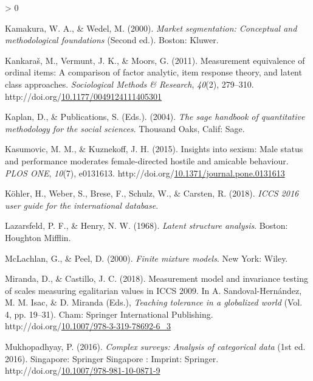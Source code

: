 \documentclass[12pt,a4paper,oneside]{reedthesis}
\newlength{\cslhangindent}
\newenvironment{CSLReferences}[2] %
 {%
  \setlength{\parindent}{0pt}
  \ifodd #1 \everypar{\setlength{\hangindent}{\cslhangindent}}\ignorespaces\fi
  \ifnum #2 > 0
  \setlength{\parskip}{#2\baselineskip}
  \fi
 }%
 {}
\begin{document}
\begin{CSLReferences}{1}{0}
\leavevmode\hypertarget{ref-kamakura_market_2000}{}%
Kamakura, W. A., \& Wedel, M. (2000). \emph{Market segmentation: Conceptual and methodological foundations} (Second ed.). Boston: Kluwer.

\leavevmode\hypertarget{ref-kankaras_measurement_2011}{}%
Kankaraš, M., Vermunt, J. K., \& Moors, G. (2011). Measurement equivalence of ordinal items: A comparison of factor analytic, item response theory, and latent class approaches. \emph{Sociological Methods \& Research}, \emph{40}(2), 279--310. http://doi.org/\href{https://doi.org/10.1177/0049124111405301}{10.1177/0049124111405301}

\leavevmode\hypertarget{ref-kaplan_sage_2004}{}%
Kaplan, D., \& Publications, S. (Eds.). (2004). \emph{The sage handbook of quantitative methodology for the social sciences}. Thousand Oaks, Calif: Sage.

\leavevmode\hypertarget{ref-kasumovic_insights_2015}{}%
Kasumovic, M. M., \& Kuznekoff, J. H. (2015). Insights into sexism: Male status and performance moderates female-directed hostile and amicable behaviour. \emph{{PLOS} {ONE}}, \emph{10}(7), e0131613. http://doi.org/\href{https://doi.org/10.1371/journal.pone.0131613}{10.1371/journal.pone.0131613}

\leavevmode\hypertarget{ref-kohler_iccs_2018}{}%
Köhler, H., Weber, S., Brese, F., Schulz, W., \& Carsten, R. (2018). \emph{{ICCS} 2016 user guide for the international database}.

\leavevmode\hypertarget{ref-lazarsfeld_latent_1968}{}%
Lazarsfeld, P. F., \& Henry, N. W. (1968). \emph{Latent structure analysis}. Boston: Houghton Mifflin.

\leavevmode\hypertarget{ref-mclachlan_finite_2000}{}%
McLachlan, G., \& Peel, D. (2000). \emph{Finite mixture models}. New York: Wiley.

\leavevmode\hypertarget{ref-miranda_measurement_2018}{}%
Miranda, D., \& Castillo, J. C. (2018). Measurement model and invariance testing of scales measuring egalitarian values in {ICCS} 2009. In A. Sandoval-Hernández, M. M. Isac, \& D. Miranda (Eds.), \emph{Teaching tolerance in a globalized world} (Vol. 4, pp. 19--31). Cham: Springer International Publishing. http://doi.org/\href{https://doi.org/10.1007/978-3-319-78692-6_3}{10.1007/978-3-319-78692-6\_3}

\leavevmode\hypertarget{ref-mukhopadhyay_complex_2016}{}%
Mukhopadhyay, P. (2016). \emph{Complex surveys: Analysis of categorical data} (1st ed. 2016). Singapore: Springer Singapore : Imprint: Springer. http://doi.org/\href{https://doi.org/10.1007/978-981-10-0871-9}{10.1007/978-981-10-0871-9}


\end{CSLReferences}
\end{document}
